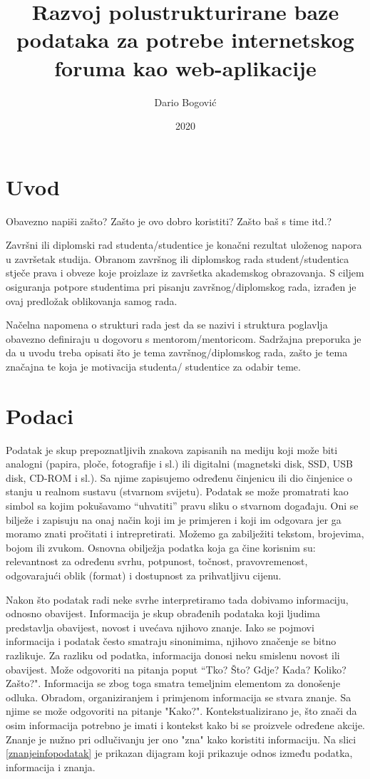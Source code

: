 \documentclass{foi}
\title{Razvoj polustrukturirane baze podataka za potrebe internetskog foruma kao web-aplikacije}
\author{Dario Bogović}
\date{2020}
\begin{document}
\maketitle

\tableofcontents

\pagestyle{plain}
\chapter{Uvod}

Obavezno napiši zašto? Zašto je ovo dobro koristiti? Zašto baš s time itd.?

Završni ili diplomski rad studenta/studentice je konačni rezultat uloženog napora u završetak studija. Obranom završnog ili diplomskog rada student/studentica stječe prava i obveze koje proizlaze iz završetka akademskog obrazovanja. S ciljem osiguranja potpore studentima pri pisanju završnog/diplomskog rada, izrađen je ovaj predložak oblikovanja samog rada.

Načelna napomena o strukturi rada jest da se nazivi i struktura poglavlja obavezno definiraju u dogovoru s mentorom/mentoricom. Sadržajna preporuka je da u uvodu treba opisati što je tema završnog/diplomskog rada, zašto je tema značajna te koja je motivacija studenta/ studentice za odabir teme. 

\chapter{Podaci}

Podatak je skup prepoznatljivih znakova zapisanih na mediju koji može biti analogni (papira, ploče, fotografije i sl.)  ili digitalni (magnetski disk, SSD, USB disk, CD-ROM i sl.). Sa njime zapisujemo određenu činjenicu ili dio činjenice o stanju u realnom sustavu (stvarnom svijetu). Podatak se može promatrati kao simbol sa kojim pokušavamo “uhvatiti” pravu sliku o stvarnom događaju. Oni se bilježe i zapisuju na onaj način koji im je primjeren i koji im odgovara jer ga moramo znati pročitati i intrepretirati. Možemo ga zabilježiti tekstom, brojevima, bojom ili zvukom. Osnovna obilježja podatka koja ga čine korisnim su: relevantnost za određenu svrhu, potpunost, točnost, pravovremenost, odgovarajući oblik (format) i dostupnost za prihvatljivu cijenu. 

Nakon što podatak radi neke svrhe interpretiramo tada dobivamo informaciju, odnosno obavijest. Informacija je skup obrađenih podataka koji ljudima predstavlja obavijest, novost i uvećava njihovo znanje. Iako se pojmovi informacija i podatak često smatraju sinonimima, njihovo značenje se bitno razlikuje. Za razliku od podatka, informacija donosi neku smislenu novost ili obavijest. Može odgovoriti na pitanja poput “Tko? Što? Gdje? Kada? Koliko? Zašto?". Informacija se zbog toga smatra temeljnim elementom za donošenje odluka. Obradom, organiziranjem i primjenom informacija se stvara znanje. Sa njime se može odgovoriti na pitanje "Kako?". Kontekstualizirano je, što znači da osim informacija potrebno je imati i kontekst kako bi se proizvele određene akcije. Znanje je nužno pri odlučivanju jer ono "zna" kako koristiti informaciju. \cite{poslovnoRacunarstvo} Na slici \ref{znanjeinfopodatak} je prikazan dijagram koji prikazuje odnos između podatka, informacija i znanja.
\end{document}
